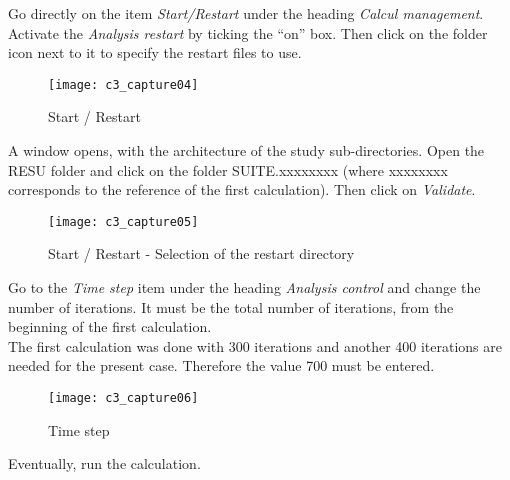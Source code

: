 Go directly on the item {\itshape Start/Restart} under the heading
{\itshape Calcul management}.  Activate the {\itshape Analysis restart}
by ticking the ``on'' box. Then click on the folder icon next to it to specify
the restart files to use.

\begin{figure}[h!]
\begin{center}
\texttt{[image: c3\_capture04]}
\caption{Start / Restart}
\label{fig4_e3}
\end{center}
\end{figure}


\newpage
A window opens, with the architecture of the study sub-directories. Open the
RESU folder and click on the folder SUITE.xxxxxxxx (where xxxxxxxx corresponds
to the reference of the first calculation). Then click on {\itshape Validate}.

\begin{figure}[h!]
\begin{center}
\texttt{[image: c3\_capture05]}
\caption{Start / Restart - Selection of the restart directory}
\label{fig5_e3}
\end{center}
\end{figure}


\newpage
Go to the {\itshape Time step} item under the heading {\itshape Analysis
control} and change the number of iterations. It must be the total number of
iterations, from the beginning of the first calculation.\\

The first calculation was done with 300 iterations and another 400 iterations
are needed for the present case. Therefore the value 700 must be entered.

\begin{figure}[h!]
\begin{center}
\texttt{[image: c3\_capture06]}
\caption{Time step}
\label{fig6_e3}
\end{center}
\end{figure}

Eventually, run the calculation.
